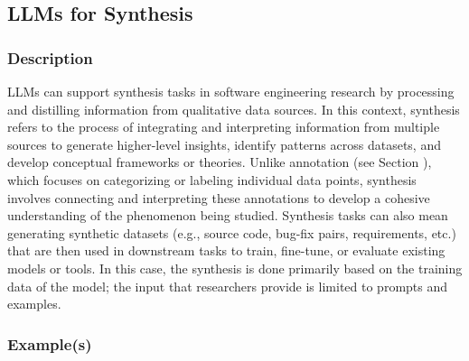 \subsection{LLMs for Synthesis}
\label{sec:llms-for-synthesis}

\subsubsection{Description}

LLMs can support synthesis tasks in software engineering research by processing and distilling information from qualitative data sources.
In this context, synthesis refers to the process of integrating and interpreting information from multiple sources to generate higher-level insights, identify patterns across datasets, and develop conceptual frameworks or theories.
Unlike annotation (see Section \annotators), which focuses on categorizing or labeling individual data points, synthesis involves connecting and interpreting these annotations to develop a cohesive understanding of the phenomenon being studied.
Synthesis tasks can also mean generating synthetic datasets (e.g., source code, bug-fix pairs, requirements, etc.) that are then used in downstream tasks to train, fine-tune, or evaluate existing models or tools.
In this case, the synthesis is done primarily based on the training data of the model; the input that researchers provide is limited to prompts and examples.

\subsubsection{Example(s)} 

